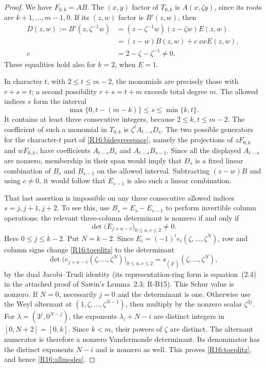 \begin{proof}
We have $F_{0,k}=AB$. The $(x,y)$ factor of $T_{0,k}$ is
$A(x,\zeta y)$, since its roots are $k+1,\ldots,m-1,0$.
If its $(z,w)$ factor is $B'(z,w)$, then
\[
 \begin{aligned}
 D(z,w):=B'(z,\zeta^{-1}w)
   &=(z-\zeta^{-1}w)(z-\zeta w)E(z,w)\\
   &=(z-w)B(z,w)+c\,zwE(z,w),\\
 c&=2-\zeta-\zeta^{-1}\ne0.
 \end{aligned}
\]
These equalities hold also for $k=2$, when $E=1$.

In character $t$, with $2\leq t\leq m-2$, the monomials
are precisely those with $r+s=t$; a second possibility
$r+s=t+m$ exceeds total degree $m$.
The allowed indices $s$ form the interval
\[
 \max\{0,t-(m-k)\}\leq s\leq\min\{k,t\}.
\]
It contains at least three consecutive integers, because
$2\leq k,t\leq m-2$.
The coefficient of such a monomial in $T_{0,k}$ is
$\zeta^t A_{t-s}D_s$. The two possible generators for
the character-$t$ part of \eqref{R16:bidegreespace}, namely
the projections of $zF_{0,k}$ and $wF_{0,k}$, have
coefficients $A_{t-s}B_s$ and $A_{t-s}B_{s-1}$.
Since all the displayed $A_{t-s}$ are nonzero, membership
in their span would imply that $D_s$ is a fixed linear
combination of $B_s$ and $B_{s-1}$ on the allowed interval.
Subtracting $(z-w)B$ and using $c\ne0$, it would follow
that $E_{s-1}$ is also such a linear combination.

That last assertion is impossible on any three consecutive
allowed indices $s=j,j+1,j+2$. To see this, use
$B_s=E_s-E_{s-1}$ to perform invertible column operations:
the relevant three-column determinant is nonzero if and
only if
\begin{equation}\label{R16:toeplitz}
 \det\bigl(E_{j+u-v}\bigr)_{0\leq u,v\leq2}\ne0.
\end{equation}
Here $0\leq j\leq k-2$. Put $N=k-2$.
Since $E_i=(-1)^i e_i(\zeta,\ldots,\zeta^N)$, row and
column signs change \eqref{R16:toeplitz} to the determinant
\[
 \det\bigl(e_{j+u-v}(\zeta,\ldots,\zeta^N)\bigr)_{0\leq u,v\leq2}
   =s_{(3^j)}(\zeta,\ldots,\zeta^N),
\]
by the dual Jacobi--Trudi identity (its representation-ring
form is equation~(2.4) in the attached proof of Sawin's Lemma~2.3;
R-B15). This Schur value is nonzero. If $N=0$, necessarily $j=0$ and the determinant
is one. Otherwise use the Weyl alternant at
$(1,\zeta,\ldots,\zeta^{N-1})$, then multiply by the
nonzero scalar $\zeta^{3j}$. For
$\lambda=(3^j,0^{N-j})$, the exponents
$\lambda_i+N-i$ are distinct integers in $[0,N+2]=[0,k]$.
Since $k<m$, their powers of $\zeta$ are distinct. The
alternant numerator is therefore a nonzero Vandermonde
determinant. Its denominator has the distinct exponents
$N-i$ and is nonzero as well. This proves
\eqref{R16:toeplitz}, and hence \eqref{R16:allmodes}.


\end{proof}
